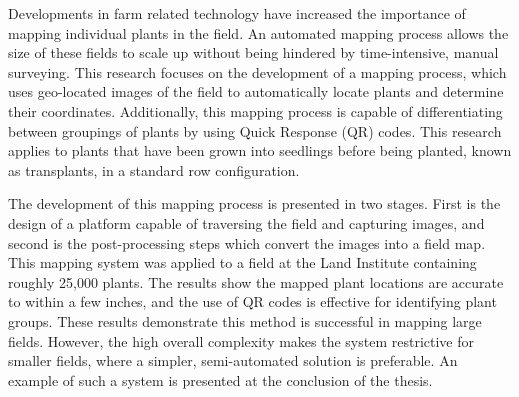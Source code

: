 
\pagestyle{empty}
\setlength{\baselineskip}{0.8cm}




Developments in farm related technology have increased the importance of mapping individual plants in the field.  An automated mapping process allows the size of these fields to scale up without being hindered by time-intensive, manual surveying.  This research focuses on the development of a mapping process, which uses geo-located images of the field to automatically locate plants and determine their coordinates.  Additionally, this mapping process is capable of differentiating between groupings of plants by using Quick Response (QR) codes.  This research applies to plants that have been grown into seedlings before being planted, known as transplants, in a standard row configuration. 

The development of this mapping process is presented in two stages.  First is the design of a platform capable of traversing the field and capturing images, and second is the post-processing steps which convert the images into a field map.  This mapping system was applied to a field at the Land Institute containing roughly 25,000 plants. The results show the mapped plant locations are accurate to within a few inches, and the use of QR codes is effective for identifying plant groups.  These results demonstrate this method is successful in mapping large fields.  However, the high overall complexity makes the system restrictive for smaller fields, where a simpler, semi-automated solution is preferable. An example of such a system is presented at the conclusion of the thesis.
